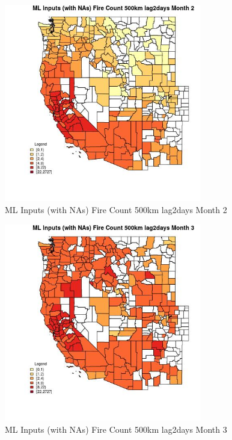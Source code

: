 \begin{figure} 
\centering  
\includegraphics[width=0.77\textwidth]{Code_Outputs/Report_ML_input_PM25_Step4_part_f_de_duplicated_aveswNAs_CountyFire_Count_500km_lag2daysmedianMonth2.jpg} 
\caption{\label{fig:Report_ML_input_PM25_Step4_part_f_de_duplicated_aveswNAsCountyFire_Count_500km_lag2daysmedianMonth2}ML Inputs (with NAs) Fire Count 500km lag2days Month 2} 
\end{figure} 
 

\begin{figure} 
\centering  
\includegraphics[width=0.77\textwidth]{Code_Outputs/Report_ML_input_PM25_Step4_part_f_de_duplicated_aveswNAs_CountyFire_Count_500km_lag2daysmedianMonth3.jpg} 
\caption{\label{fig:Report_ML_input_PM25_Step4_part_f_de_duplicated_aveswNAsCountyFire_Count_500km_lag2daysmedianMonth3}ML Inputs (with NAs) Fire Count 500km lag2days Month 3} 
\end{figure} 
 

